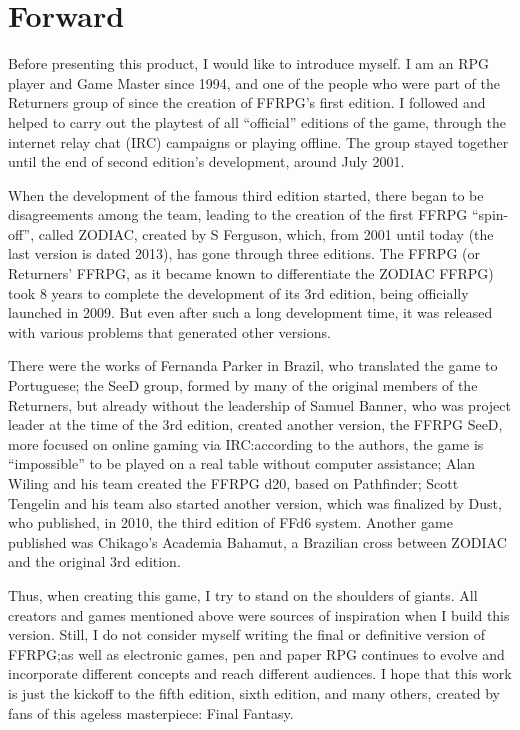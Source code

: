 
\begin{center}
\end{center}
\section{Forward}\label{sec:forward}
\begin{multicols}{2}
Before presenting this product, I would like to introduce myself. I am an RPG player and Game Master since 1994, and one of the people who were part of the Returners group of since the creation of FFRPG’s first edition. I followed and helped to carry out the playtest of all ``official'' editions of the game, through the internet relay chat (IRC) campaigns or playing offline. The group stayed together until the end of second edition’s development, around July 2001.

When the development of the famous third edition started, there began to be disagreements among the team, leading to the creation of the first FFRPG ``spin-off'', called ZODIAC, created by S Ferguson, which, from 2001 until today (the last version is dated 2013), has gone through three editions. The FFRPG (or Returners' FFRPG, as it became known to differentiate the ZODIAC FFRPG) took 8 years to complete the development of its 3rd edition, being officially launched in 2009. But even after such a long development time, it was released with various problems that generated other versions.

There were the works of Fernanda Parker in Brazil, who translated the game to Portuguese; the SeeD group, formed by many of the original members of the Returners, but already without the leadership of Samuel Banner, who was project leader at the time of the 3rd edition, created another version, the FFRPG SeeD, more focused on online gaming via IRC:\@{}according to the authors, the game is ``impossible'' to be played on a real table without computer assistance; Alan Wiling and his team created the FFRPG d20, based on Pathfinder; Scott Tengelin and his team also started another version, which was finalized by Dust, who published, in 2010, the third edition of FFd6 system. Another game published was Chikago’s Academia Bahamut, a Brazilian cross between ZODIAC and the original 3rd edition.

Thus, when creating this game, I try to stand on the shoulders of giants. All creators and games mentioned above were sources of inspiration when I build this version. Still, I do not consider myself writing the final or definitive version of FFRPG;\@{}as well as electronic games, pen and paper RPG continues to evolve and incorporate different concepts and reach different audiences. I hope that this work is just the kickoff to the fifth edition, sixth edition, and many others, created by fans of this ageless masterpiece: Final Fantasy.


\end{multicols}
